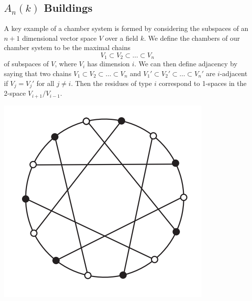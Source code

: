 \documentclass[11pt]{article}
\begin{document}

\subsection{$A_n(k)$ Buildings}

A key example of a chamber system is formed by considering the subspaces of an $n+1$ dimensional vector space $V$ over a field $k$. We define the chambers of our chamber system to be the maximal chains \[V_1\subset V_2\subset \hdots \subset V_n\] of subspaces of $V$, where $V_i$ has dimension $i$. We can then define adjacency by saying that two chains $V_1\subset V_2\subset \hdots \subset V_n$ and $V_1'\subset V_2'\subset \hdots \subset V_n'$ are $i$-adjacent if $V_j=V_j'$ for all $j\neq i$. Then the residues of type $i$ correspond to 1-spaces in the 2-space $V_{i+1}/V_{i-1}$. 





\begin{center}
\includegraphics[scale=0.5]{Screenshot 2023-03-16 131651.png}
\end{center}
\end{document}
